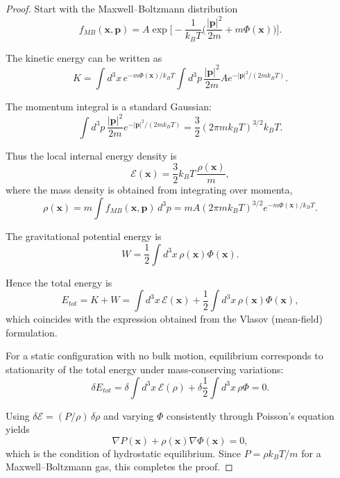 \documentclass[12pt,a4paper]{article}
\numberwithin{equation}{section}
\begin{document}
\begin{proof}
Start with the Maxwell–Boltzmann distribution
\begin{equation}
f_{MB}(\mathbf{x}, \mathbf{p})
= A \exp\!\Bigg[-\frac{1}{k_B T} \Big(\frac{|\mathbf{p}|^2}{2m} + m \Phi(\mathbf{x})\Big)\Bigg].
\end{equation}

The kinetic energy can be written as
\begin{equation}
K = \int d^3x \, e^{- m \Phi(\mathbf{x}) / k_B T}
     \int d^3p \, \frac{|\mathbf{p}|^2}{2m} A e^{- |\mathbf{p}|^2 / (2m k_B T)}.
\end{equation}

The momentum integral is a standard Gaussian:
\begin{equation}
\int d^3p \, \frac{|\mathbf{p}|^2}{2m} e^{- |\mathbf{p}|^2 / (2m k_B T)}
= \frac{3}{2} (2\pi m k_B T)^{3/2} k_B T.
\end{equation}

Thus the local internal energy density is
\begin{equation}
\mathcal{E}(\mathbf{x}) = \frac{3}{2} k_B T \, \frac{\rho(\mathbf{x})}{m},
\end{equation}
where the mass density is obtained from integrating over momenta,
\begin{equation}
\rho(\mathbf{x}) = m \int f_{MB}(\mathbf{x}, \mathbf{p}) \, d^3p
= m A (2\pi m k_B T)^{3/2} e^{- m \Phi(\mathbf{x}) / k_B T}.
\end{equation}

The gravitational potential energy is
\begin{equation}
W = \frac{1}{2} \int d^3x \, \rho(\mathbf{x}) \Phi(\mathbf{x}).
\end{equation}

Hence the total energy is
\begin{equation}
E_{tot} = K + W = \int d^3x \, \mathcal{E}(\mathbf{x})
+ \frac{1}{2} \int d^3x \, \rho(\mathbf{x}) \Phi(\mathbf{x}),
\end{equation}
which coincides with the expression obtained from the Vlasov (mean-field) formulation.

For a static configuration with no bulk motion, equilibrium corresponds to stationarity of the total energy under mass-conserving variations:
\begin{equation}
\delta E_{tot} = \delta \int d^3x \, \mathcal{E}(\rho)
+ \delta \frac{1}{2} \int d^3x \, \rho \Phi = 0.
\end{equation}

Using \(\delta \mathcal{E} = (P/\rho)\,\delta\rho\) and varying \(\Phi\) consistently through Poisson’s equation yields
\begin{equation}
\nabla P(\mathbf{x}) + \rho(\mathbf{x}) \nabla \Phi(\mathbf{x}) = 0,
\end{equation}
which is the condition of hydrostatic equilibrium.
Since \(P = \rho k_B T / m\) for a Maxwell–Boltzmann gas, this completes the proof.
\end{proof}
\end{document}
